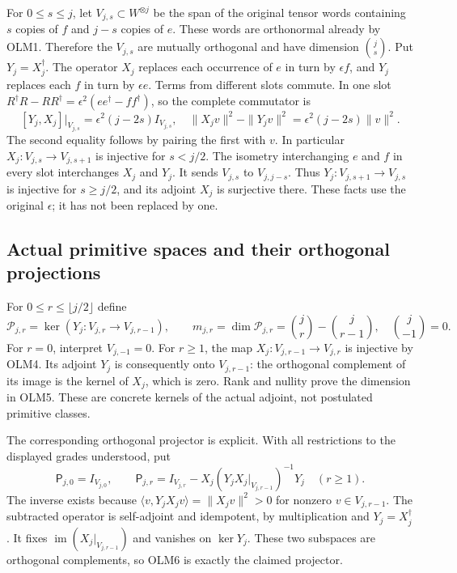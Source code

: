 For $0\le s\le j$, let $V_{j,s}\subset W^{\otimes j}$ be the
span of the original tensor words containing $s$ copies of $f$
and $j-s$ copies of $e$. These words are orthonormal already by
OLM1. Therefore the $V_{j,s}$ are mutually orthogonal and have
dimension $\binom js$.
Put $Y_j=X_j^\dagger$.
The operator $X_j$ replaces each occurrence of $e$ in turn by
$\epsilon f$, and $Y_j$ replaces each $f$ in turn by $\epsilon e$.
Terms from different slots commute. In one slot
$R^\dagger R-RR^\dagger=\epsilon^2(ee^\dagger-ff^\dagger)$,
so the complete commutator is
\[
[Y_j,X_j]|_{V_{j,s}}=\epsilon^2(j-2s)I_{V_{j,s}},
\quad
\|X_jv\|^2-\|Y_jv\|^2
 =\epsilon^2(j-2s)\|v\|^2.
\tag{OLM4}
\]
The second equality follows by pairing the first with $v$.
In particular $X_j:V_{j,s}\to V_{j,s+1}$ is injective for
$s<j/2$. The isometry interchanging $e$ and $f$ in every slot
interchanges $X_j$ and $Y_j$. It sends $V_{j,s}$ to $V_{j,j-s}$.
Thus $Y_j:V_{j,s+1}\to V_{j,s}$ is injective for $s\ge j/2$,
and its adjoint $X_j$ is surjective there.
These facts use the original $\epsilon$; it has not been replaced
by one.

\subsection{Actual primitive spaces and their orthogonal projections}

For $0\le r\le\lfloor j/2\rfloor$ define
\[
\mathcal P_{j,r}=\ker(Y_j:V_{j,r}\to V_{j,r-1}),
\qquad
m_{j,r}=\dim\mathcal P_{j,r}
         =\binom jr-\binom j{r-1},
\quad\binom j{-1}=0.
\tag{OLM5}
\]
For $r=0$, interpret $V_{j,-1}=0$.
For $r\ge1$, the map $X_j:V_{j,r-1}\to V_{j,r}$ is injective
by OLM4. Its adjoint $Y_j$ is consequently onto $V_{j,r-1}$:
the orthogonal complement of its image is the kernel of $X_j$,
which is zero. Rank and nullity prove the dimension in OLM5.
These are concrete kernels of the actual adjoint, not postulated
primitive classes.

The corresponding orthogonal projector is explicit. With all
restrictions to the displayed grades understood, put
\[
\mathsf P_{j,0}=I_{V_{j,0}},\qquad
\mathsf P_{j,r}
=I_{V_{j,r}}-X_j(Y_jX_j|_{V_{j,r-1}})^{-1}Y_j
\quad(r\ge1).
\tag{OLM6}
\]
The inverse exists because
$\langle v,Y_jX_jv\rangle=\|X_jv\|^2>0$ for nonzero
$v\in V_{j,r-1}$. The subtracted operator is self-adjoint and
idempotent, by multiplication and $Y_j=X_j^\dagger$.
It fixes $\operatorname{im}(X_j|_{V_{j,r-1}})$ and vanishes
on $\ker Y_j$. These two subspaces are orthogonal complements,
so OLM6 is exactly the claimed projector.

